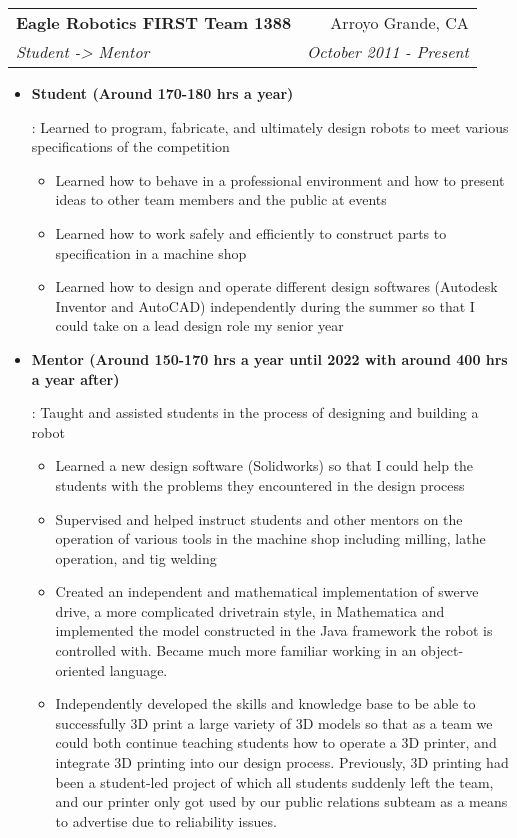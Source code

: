 \documentclass[letterpaper,10pt]{article}
\makeatletter
\newcommand{\resumeItem}[2]{
  \item\small{
    \textbf{#1}{: #2 \vspace{-2pt}}
  }
}
\newcommand{\resumeSubheading}[4]{
  \vspace{-1pt}\item[]
  \begin{tabular*}{0.98\textwidth}{l@{\extracolsep{\fill}}r}
      \hspace{-10pt}\textbf{#1} & #2 \\
      \hspace{-10pt}\textit{\small#3} & \textit{\small #4} \\
    \end{tabular*}\vspace{-5pt}
}
\newcommand{\resumeItemListStart}{\begin{itemize}}
\newcommand{\resumeItemListEnd}{\end{itemize}\vspace{-5pt}}
\makeatother
\begin{document}
    \resumeSubheading
      {Eagle Robotics FIRST Team 1388}{Arroyo Grande, CA}
      {Student -> Mentor}{October 2011 - Present}
      \resumeItemListStart
        \resumeItem{Student (Around 170-180 hrs a year)}
          {Learned to program, fabricate, and ultimately design robots to meet various specifications of the competition
          \begin{itemize}
              \item Learned how to behave in a professional environment and how to present ideas to other team members and the public at events
              \item Learned how to work safely and efficiently to construct parts to specification in a machine shop
              \item Learned how to design and operate different design softwares (Autodesk Inventor and AutoCAD) independently during the summer so that I could take on a lead design role my senior year
          \end{itemize}
          }
          \resumeItem{Mentor (Around 150-170 hrs a year until 2022 with around 400 hrs a year after)}
          {Taught and assisted students in the process of designing and building a robot
          \begin{itemize}
              \item Learned a new design software (Solidworks) so that I could help the students with the problems they encountered in the design process
              \item Supervised and helped instruct students and other mentors on the operation of various tools in the machine shop including milling, lathe operation, and tig welding
              \item Created an independent and mathematical implementation of swerve drive, a more complicated drivetrain style, in Mathematica and implemented the model constructed in the Java framework the robot is controlled with. Became much more familiar working in an object-oriented language.
	   \item Independently developed the skills and knowledge base to be able to successfully 3D print a large variety of 3D models so that as a team we could both continue teaching students how to operate a 3D printer, and integrate 3D printing into our design process. Previously, 3D printing had been a student-led project of which all students suddenly left the team, and our printer only got used by our public relations subteam as a means to advertise due to reliability issues.
          \end{itemize}
          }
      \resumeItemListEnd
\end{document}
